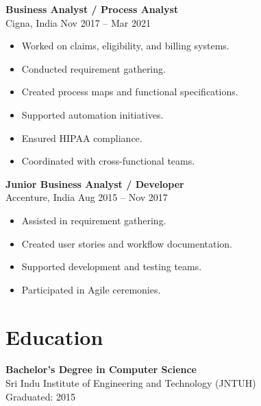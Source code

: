 \documentclass[a4paper,10pt]{article}
\begin{document}
\vspace{4mm}

\textbf{Business Analyst / Process Analyst}\\
Cigna, India \hfill Nov 2017 -- Mar 2021

\begin{itemize}[leftmargin=*]
\item Worked on claims, eligibility, and billing systems.
\item Conducted requirement gathering.
\item Created process maps and functional specifications.
\item Supported automation initiatives.
\item Ensured HIPAA compliance.
\item Coordinated with cross-functional teams.
\end{itemize}

\vspace{4mm}

\textbf{Junior Business Analyst / Developer}\\
Accenture, India \hfill Aug 2015 -- Nov 2017

\begin{itemize}[leftmargin=*]
\item Assisted in requirement gathering.
\item Created user stories and workflow documentation.
\item Supported development and testing teams.
\item Participated in Agile ceremonies.
\end{itemize}


\section*{Education}

\textbf{Bachelor's Degree in Computer Science}\\
Sri Indu Institute of Engineering and Technology (JNTUH)\\
Graduated: 2015
\end{document}

